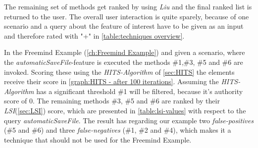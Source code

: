 The remaining set of methods get ranked by using \textit{Liu} and the final ranked list is returned to the user.
The overall user interaction is quite sparely, because of one scenario and a query about the feature of interest have to be given as an input and therefore rated with "+" in \autoref{table:techniques overview}. \cite{revelle2010using}


In the Freemind Example (\autoref{ch:Freemind Example}) and given a scenario, where the \textit{automaticSaveFile}-feature is executed the methods \#1,\#3, \#5 and \#6 are invoked. Scoring these using the \textit{HITS-Algorithm} of \autoref{sec:HITS} the elements receive their score in \autoref{graph:HITS - after 100 iterations}. Assuming the \textit{HITS-Algorithm} has a significant threshold \#1 will be filtered, because it's authority score of 0. \newline
The remaining methods \#3, \#5 and \#6 are ranked by their \textit{LSI}(\autoref{sec:LSI}) score, which are presented in \autoref{table:lsi-values} with respect to the query \textit{automaticSaveFile}.\newline
The result has regarding our example two \textit{false-positives} (\#5 and \#6) and three \textit{false-negatives} (\#1, \#2 and \#4), which makes it a technique that should not be used for the Freemind Example.


